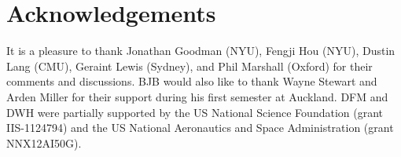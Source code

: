 \documentclass[manuscript]{aastex}
\begin{document}


\section{Acknowledgements}
It is a pleasure to thank
  Jonathan Goodman (NYU),
  Fengji Hou (NYU),
  Dustin Lang (CMU),
  Geraint Lewis (Sydney), and
  Phil Marshall (Oxford)
for their comments and discussions.
BJB would also
like to thank Wayne Stewart and Arden Miller for their support during
his first semester at Auckland.
DFM and DWH were partially supported by
   the US National Science Foundation (grant IIS-1124794) and
   the US National Aeronautics and Space Administration (grant NNX12AI50G).

\appendix
\end{document}
